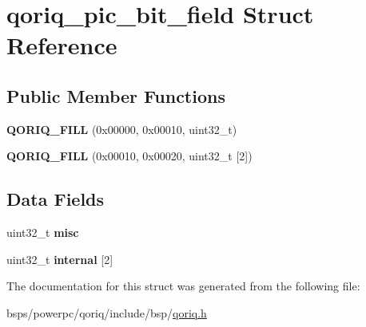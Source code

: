 \hypertarget{structqoriq__pic__bit__field}{}\section{qoriq\+\_\+pic\+\_\+bit\+\_\+field Struct Reference}
\label{structqoriq__pic__bit__field}
\subsection*{Public Member Functions}
\begin{DoxyCompactItemize}
\item 
\mbox{\label{structqoriq__pic__bit__field_a203df07388bf2b366196a28ab784f1e9}} 
{\bfseries Q\+O\+R\+I\+Q\+\_\+\+F\+I\+LL} (0x00000, 0x00010, uint32\+\_\+t)
\item 
\mbox{\label{structqoriq__pic__bit__field_a5cbdbb8436333ebdaf379a9d1dfd4363}} 
{\bfseries Q\+O\+R\+I\+Q\+\_\+\+F\+I\+LL} (0x00010, 0x00020, uint32\+\_\+t \mbox{[}2\mbox{]})
\end{DoxyCompactItemize}
\subsection*{Data Fields}
\begin{DoxyCompactItemize}
\item 
\mbox{\label{structqoriq__pic__bit__field_ab33100b3c43e15b9e9ed25a3b0518c88}} 
uint32\+\_\+t {\bfseries misc}
\item 
\mbox{\label{structqoriq__pic__bit__field_aa45c95b024254f8c9543b48c4ab0faac}} 
uint32\+\_\+t {\bfseries internal} \mbox{[}2\mbox{]}
\end{DoxyCompactItemize}


The documentation for this struct was generated from the following file\+:\begin{DoxyCompactItemize}
\item 
bsps/powerpc/qoriq/include/bsp/\mbox{\hyperlink{qoriq_8h}{qoriq.\+h}}\end{DoxyCompactItemize}
